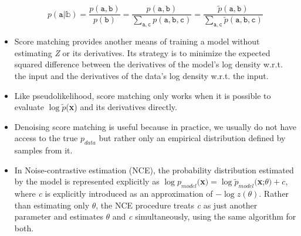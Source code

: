 \documentclass{article}
\begin{document}
\begin{itemize}
\[
	p(\mathtt{a}|\mathbb{b}) = \frac{p(\mathtt{a, b})}{p(\mathtt{b})} = \frac{p(\mathtt{a, b})}{\sum_{\mathtt{a,c}} p(\mathtt{a, b, c})} = \frac{\tilde{p}(\mathtt{a, b})}{\sum_{\mathtt{a,c}} \tilde{p}(\mathtt{a,b,c})}
\]
\item Score matching provides another means of training a model without estimating \textit{Z} or its derivatives. Its strategy is to minimize the expected squared difference between the derivatives of the model's log density w.r.t. the input and the derivatives of the data's log density w.r.t. the input.
\item Like pseudolikelihood, score matching only works when it is possible to evaluate \(\log \tilde{p}\)(\textbf{x}) and its derivatives directly.
\item Denoising score matching is useful because in practice, we usually do not have access to the true \(p_{data}\) but rather only an empirical distribution defined by samples from it.
\item In Noise-contrastive estimation (NCE), the probability distribution estimated by the model is represented explicitly as \(\log p_{model}(\)\textbf{x}\() = \log \tilde{p}_{model}(\)\textbf{x};\(\theta) + c\), where \textit{c} is explicitly introduced as an approximation of \(-\log z(\theta)\). Rather than estimating only \(\theta\), the NCE procedure treats \textit{c} as just another parameter and estimates \(\theta\) and \textit{c} simultaneously, using the same algorithm for both.
\end{itemize}
\end{document}
